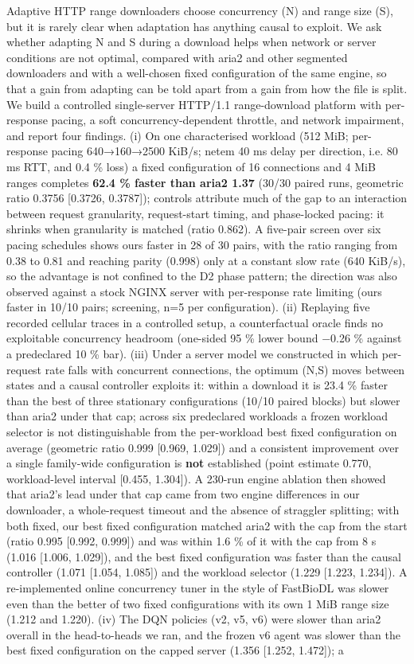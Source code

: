 \documentclass[10pt,a4paper]{article}
\begin{document}
Adaptive HTTP range downloaders choose concurrency (N) and range size (S), but it is rarely clear when adaptation has anything causal to exploit. We ask whether adapting N and S during a download helps when network or server conditions are not optimal, compared with aria2 and other segmented downloaders and with a well-chosen fixed configuration of the same engine, so that a gain from adapting can be told apart from a gain from how the file is split. We build a controlled single-server HTTP/1.1 range-download platform with per-response pacing, a soft concurrency-dependent throttle, and network impairment, and report four findings. (i) On one characterised workload (512 MiB; per-response pacing 640→160→2500 KiB/s; netem 40 ms delay per direction, i.e. 80 ms RTT, and 0.4 \% loss) a fixed configuration of 16 connections and 4 MiB ranges completes \textbf{62.4 \% faster than aria2 1.37} (30/30 paired runs, geometric ratio 0.3756 [0.3726, 0.3787]); controls attribute much of the gap to an interaction between request granularity, request-start timing, and phase-locked pacing: it shrinks when granularity is matched (ratio 0.862). A five-pair screen over six pacing schedules shows ours faster in 28 of 30 pairs, with the ratio ranging from 0.38 to 0.81 and reaching parity (0.998) only at a constant slow rate (640 KiB/s), so the advantage is not confined to the D2 phase pattern; the direction was also observed against a stock NGINX server with per-response rate limiting (ours faster in 10/10 pairs; screening, n=5 per configuration). (ii) Replaying five recorded cellular traces in a controlled setup, a counterfactual oracle finds no exploitable concurrency headroom (one-sided 95 \% lower bound −0.26 \% against a predeclared 10 \% bar). (iii) Under a server model we constructed in which per-request rate falls with concurrent connections, the optimum (N,S) moves between states and a causal controller exploits it: within a download it is 23.4 \% faster than the best of three stationary configurations (10/10 paired blocks) but slower than aria2 under that cap; across six predeclared workloads a frozen workload selector is not distinguishable from the per-workload best fixed configuration on average (geometric ratio 0.999 [0.969, 1.029]) and a consistent improvement over a single family-wide configuration is \textbf{not} established (point estimate 0.770, workload-level interval [0.455, 1.304]). A 230-run engine ablation then showed that aria2's lead under that cap came from two engine differences in our downloader, a whole-request timeout and the absence of straggler splitting; with both fixed, our best fixed configuration matched aria2 with the cap from the start (ratio 0.995 [0.992, 0.999]) and was within 1.6 \% of it with the cap from 8 s (1.016 [1.006, 1.029]), and the best fixed configuration was faster than the causal controller (1.071 [1.054, 1.085]) and the workload selector (1.229 [1.223, 1.234]). A re-implemented online concurrency tuner in the style of FastBioDL was slower even than the better of two fixed configurations with its own 1 MiB range size (1.212 and 1.220). (iv) The DQN policies (v2, v5, v6) were slower than aria2 overall in the head-to-heads we ran, and the frozen v6 agent was slower than the best fixed configuration on the capped server (1.356 [1.252, 1.472]); a 
\end{document}
